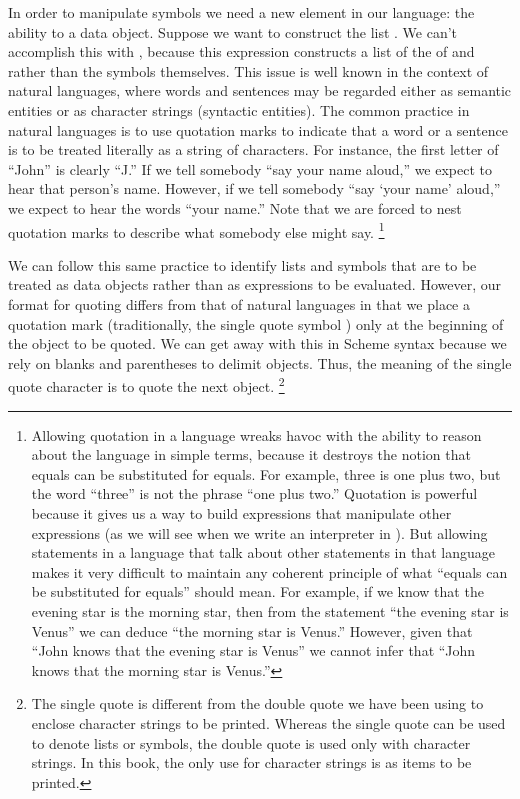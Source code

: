 In order to manipulate symbols we need a new element in our language:
the ability to  a data object.
Suppose we want to construct the list .
We can’t accomplish this with , because this expression constructs a list of the  of  and  rather than the symbols themselves.
This issue is well known in the context of natural languages, where words and sentences may be regarded either as semantic entities or as character strings (syntactic entities).
The common practice in natural languages is to use quotation marks to indicate that a word or a sentence is to be treated literally as a string of characters.
For instance, the first letter of “John”  is clearly  “J.”
If we tell somebody “say your name aloud,” we expect to hear that person’s name.
However, if we tell somebody “say ‘your name’ aloud,” we expect to hear the words “your name.”
Note that we are forced to nest quotation marks to describe what somebody else might say.%
\footnote{
	Allowing quotation in a language wreaks havoc with the ability to reason about the language in simple terms, because it destroys the notion that equals can be substituted for equals.
	For example, three is one plus two, but the word “three” is not the phrase “one plus two.”
	Quotation is powerful because it gives us a way to build expressions that manipulate other expressions (as we will see when we write an interpreter in ).
	But allowing statements in a language that talk about other statements in that language makes it very difficult to maintain any coherent principle of what “equals can be substituted for equals” should mean.
	For example, if we know that the evening star is the morning star, then from the statement “the evening star is Venus” we can deduce “the morning star is Venus.”
	However, given that  “John knows that the evening star is Venus” we cannot infer that “John knows that the morning star is Venus.”
}

We can follow this same practice to identify lists and symbols that are to be treated as data objects rather than as expressions to be evaluated.
However, our format for quoting differs from that of natural languages in that we place a quotation mark (traditionally, the single quote symbol ) only at the beginning of the object to be quoted.
We can get away with this in Scheme syntax because we rely on blanks and parentheses to delimit objects.
Thus, the meaning of the single quote character is to quote the next object.%
\footnote{
	The single quote is different from the double quote we have been using to enclose character strings to be printed.
	Whereas the single quote can be used to denote lists or symbols, the double quote is used only with character strings.
	In this book, the only use for character strings is as items to be printed.
}

